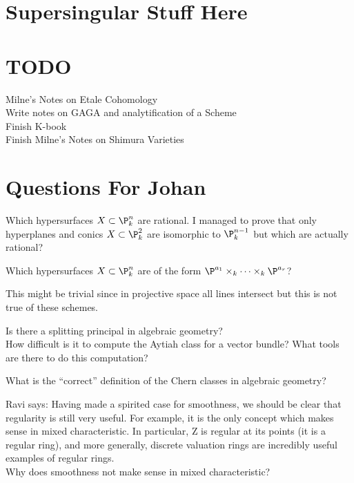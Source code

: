 \documentclass[12pt]{article}
\begin{document}
\section{Supersingular Stuff Here}

\section{TODO}

Milne's Notes on Etale Cohomology
\\
Write notes on GAGA and analytification of a Scheme
\\
Finish K-book
\\
Finish Milne's Notes on Shimura Varieties

\section{Questions For Johan}

\begin{exercise}
Which hypersurfaces $X \subset \P^n_k$ are rational. I managed to prove that only hyperplanes and conics $X \subset \P^2_k$ are isomorphic to $\P^{n-1}_k$ but which are actually rational?
\end{exercise}

\begin{exercise}
Which hypersurfaces $X \subset \P^n_k$ are of the form $\P^{a_1} \times_k \cdots \times_k \P^{a_r}$?
\end{exercise}

This might be trivial since in projective space all lines intersect but this is not true of these schemes.

\begin{exercise}
Is there a splitting principal in algebraic geometry? 
\\
How difficult is it to compute the Aytiah class for a vector bundle? What tools are there to do this computation?
\end{exercise}

\begin{exercise}
What is the ``correct'' definition of the Chern classes in algebraic geometry?
\end{exercise}

\begin{exercise}
Ravi says:
Having made a spirited case for smoothness, we
should be clear that regularity is still very useful. For example, it is the only concept which makes sense in mixed characteristic. In particular, Z is regular at its
points (it is a regular ring), and more generally, discrete valuation rings are incredibly useful examples of regular rings.
\bigskip\\
Why does smoothness not make sense in mixed characteristic?
\end{exercise}
\end{document}

